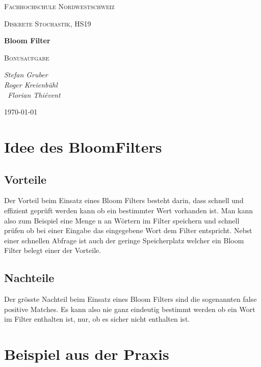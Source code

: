 \documentclass[12pt,a4paper]{report}
\begin{document}
\begin{titlepage}
	\centering
	\qquad
	\par\vspace{1cm}
	{\scshape\LARGE Fachhochschule Nordwestschweiz \par}
	{\scshape\Large Diskrete Stochastik, HS19\par}
	\vspace{5cm}
	{\huge\bfseries Bloom Filter\par}
	{\scshape\Large Bonusaufgabe\par}
	\vspace{2cm}
	{\Large\itshape  Stefan Gruber \\ Roger Kreienbühl \\ Florian Thiévent \par}
	\vfill
	{\large \today\par}
\end{titlepage}

\tableofcontents
\newpage

\chapter{Idee des BloomFilters}\label{ch:idee-des-bloomfilters}
\section{Vorteile}\label{sec:vorteile}
Der Vorteil beim Einsatz eines Bloom Filters besteht darin, dass schnell und effizient geprüft werden kann ob ein bestimmter Wert vorhanden ist. Man kann also zum Beispiel eine Menge n an Wörtern im Filter speichern und schnell prüfen ob bei einer Eingabe das eingegebene Wort dem Filter entspricht. Nebst einer schnellen Abfrage ist auch der geringe Speicherplatz welcher ein Bloom Filter belegt einer der Vorteile.
\section{Nachteile}\label{sec:nachteile}
Der grösste Nachteil beim Einsatz eines Bloom Filters sind die sogenannten false positive Matches. Es kann also nie ganz eindeutig bestimmt werden ob ein Wort im Filter enthalten ist, nur, ob es sicher nicht enthalten ist.

\chapter{Beispiel aus der Praxis}\label{ch:beispiel-aus-der-praxis}
\end{document}

